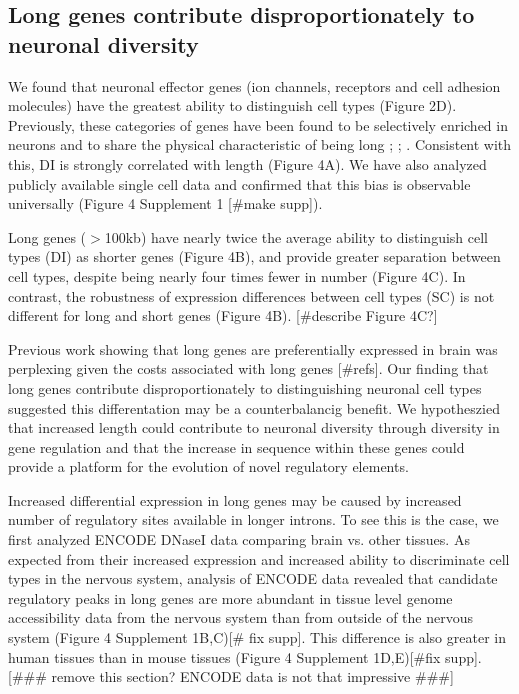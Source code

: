 \subsection{Long genes contribute disproportionately to neuronal diversity}

We found that neuronal effector genes (ion channels, receptors and cell adhesion molecules) have the greatest ability to distinguish cell types (Figure 2D). Previously, these categories of genes have been found to be selectively enriched in neurons and to share the physical characteristic of being long \cite{Sugino_2014}; \cite{Gabel_2015}; \cite{Zylka_2015}. Consistent with this, DI is strongly correlated with length (Figure 4A). We have also analyzed publicly available single cell data and confirmed that this bias is observable universally (Figure 4 Supplement 1 [#make supp]). 

Long genes ($\gt$100kb) have nearly twice the average ability to distinguish cell types (DI) as shorter genes (Figure 4B), and provide greater separation between cell types, despite being nearly four times fewer in number (Figure 4C). In contrast, the robustness of expression differences between cell types (SC) is not different for long and short genes (Figure 4B). [#describe Figure 4C?] 

Previous work showing that long genes are preferentially expressed in brain was perplexing given the costs associated with long genes [#refs]. Our finding that long genes contribute disproportionately to distinguishing neuronal cell types suggested this differentation may be a counterbalancig benefit. We hypotheszied that increased length could contribute to neuronal diversity through diversity in gene regulation and that the increase in sequence within these genes could provide a platform for the evolution of novel regulatory elements.

Increased differential expression in long genes may be caused by increased number of regulatory sites available in longer introns. To see this is the case, we first analyzed ENCODE DNaseI data comparing brain vs. other tissues. As expected from their increased expression and increased ability to discriminate cell types in the nervous system, analysis of ENCODE data revealed that candidate regulatory peaks in long genes are more abundant in tissue level genome accessibility data from the nervous system than from outside of the nervous system (Figure 4 Supplement 1B,C)[# fix supp]. This difference is also greater in human tissues than in mouse tissues (Figure 4 Supplement 1D,E)[#fix supp]. [### remove this section? ENCODE data is not that impressive ###]

